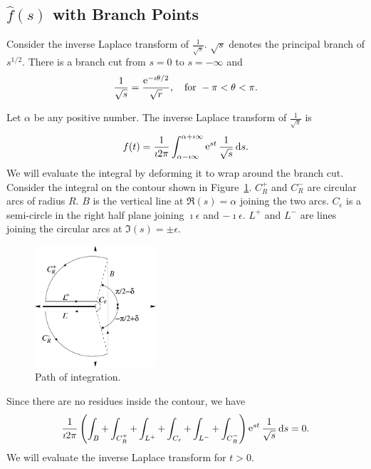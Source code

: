 \subsection{$\hat{f}(s)$ with Branch Points}






\begin{Example}
  Consider the inverse Laplace transform of $\frac{1}{\sqrt{s}}$.
  $\sqrt{s}$ denotes the principal branch of $s^{1/2}$.
  There is a branch cut from $s=0$ to $s = -\infty$ and 
  \[ 
  \frac{1}{\sqrt{s}} = \frac{\mathop{\mathrm{e}}\nolimits^{-\imath \theta / 2}}{\sqrt{r}}, 
  \quad \mathrm{for}\ -\pi < \theta < \pi.
  \]

  Let $\alpha$ be any positive number.  The inverse Laplace transform of 
  $\frac{1}{\sqrt{s}}$ is
  \[ 
  f(t) = \frac{1}{\imath 2 \pi} \int_{\alpha - \imath \infty}^{\alpha + \imath \infty} \mathop{\mathrm{e}}\nolimits^{s t} \frac{1}{\sqrt{s}}\,\mathrm{d} s.
  \]
  We will evaluate the integral by deforming it to wrap around the branch
  cut. 
  Consider the integral on the contour shown in Figure~\ref{one_over_sqrt_s}.
  $C_R^+$ and $C_R^-$ are circular arcs of radius $R$.  $B$ is the vertical
  line at $\Re(s) = \alpha$ joining the two arcs.   $C_\epsilon$ is 
  a semi-circle in the right half plane joining $\imath \epsilon$ and 
  $-\imath \epsilon$.  $L^+$ and $L^-$ are lines joining the circular arcs at 
  $\Im(s) = \pm \epsilon$.

  \begin{figure}[h!]
    \begin{center}
      \includegraphics[width=0.4\textwidth]{ode/laplace/sqrts}
    \end{center}
    \caption{Path of integration.}
    \label{one_over_sqrt_s}
  \end{figure}


  Since there are no residues inside the contour, we have
  \[
  \frac{1}{\imath 2 \pi} \left( \int_B + \int_{C_R^+} + \int_{L^+} 
    + \int_{C_\epsilon} + \int_{L^-} + \int_{C_R^-} \right)
  \mathop{\mathrm{e}}\nolimits^{s t} \frac{1}{\sqrt{s}}\,\mathrm{d} s = 0.
  \]
  We will evaluate the inverse Laplace transform for $t>0$.



\end{Example}

